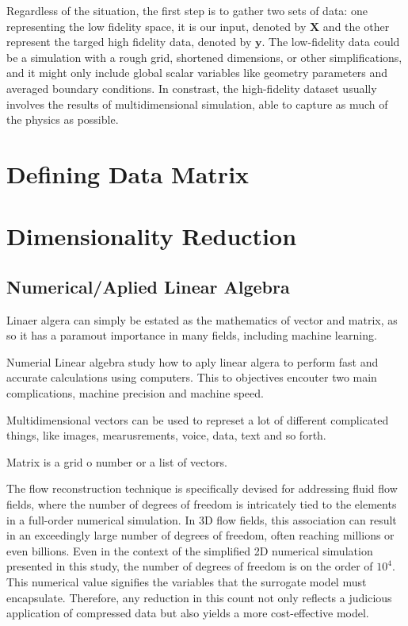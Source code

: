 Regardless of the situation, the first step is to gather two sets of data: one representing the low fidelity space, it is our input, denoted by $\mathbf{X}$ and the other represent the targed high fidelity data, denoted by $\mathbf{y}$. The low-fidelity data could be a simulation with a rough grid, shortened dimensions, or other simplifications, and it might only include global scalar variables like geometry parameters and averaged boundary conditions. In constrast, the high-fidelity dataset usually involves the results of multidimensional simulation, able to capture as much of the physics as possible.

\section{Defining Data Matrix}

\section{Dimensionality Reduction}

\subsection{Numerical/Aplied Linear Algebra}

Linaer algera can simply be estated as the mathematics of vector and matrix, as so it has a paramout importance in many fields, including machine learning.

Numerial Linear algebra study how to aply linear algera to perform fast and accurate calculations using computers. This to objectives encouter two main complications, machine precision and machine speed.

Multidimensional vectors can be used to represet a lot of different complicated things, like images, mearusrements, voice, data, text and so forth.

Matrix is a grid o number or a list of vectors.

The flow reconstruction technique is specifically devised for addressing fluid flow fields, where the number of degrees of freedom is intricately tied to the elements in a full-order numerical simulation. In 3D flow fields, this association can result in an exceedingly large number of degrees of freedom, often reaching millions or even billions. Even in the context of the simplified 2D numerical simulation presented in this study, the number of degrees of freedom is on the order of $10^4$. This numerical value signifies the variables that the surrogate model must encapsulate. Therefore, any reduction in this count not only reflects a judicious application of compressed data but also yields a more cost-effective model.

